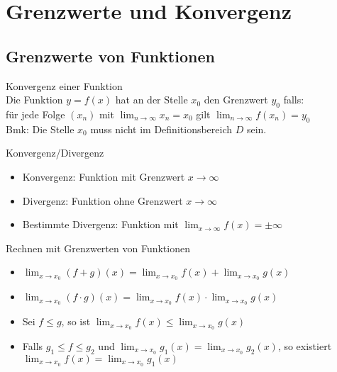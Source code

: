 \section{Grenzwerte und Konvergenz}

\subsection{Grenzwerte von Funktionen}

\begin{definition}{Konvergenz einer Funktion}\\
    Die Funktion $y = f(x)$ hat an der Stelle $x_0$ den Grenzwert $y_0$ falls:\\
    für jede Folge $\left(x_{n}\right)$ mit $\lim _{n \rightarrow \infty} x_{n}=x_{0}$ gilt $\lim _{n \rightarrow \infty} f\left(x_{n}\right)=y_{0}$\\
    Bmk: Die Stelle $x_{0}$ muss nicht im Definitionsbereich $D$ sein.
\end{definition}

\begin{concept}{Konvergenz/Divergenz}
    \begin{itemize}
        \item Konvergenz:
        Funktion mit Grenzwert $x \rightarrow \infty$
        \item Divergenz:
        Funktion ohne Grenzwert $x \rightarrow \infty$
        \item Bestimmte Divergenz:
        Funktion mit $\lim _{x \rightarrow \infty} f(x)= \pm \infty$
    \end{itemize}
\end{concept}

\begin{theorem}{Rechnen mit Grenzwerten von Funktionen}
    \begin{itemize}
        \item $\lim_{x \to x_0} (f + g)(x) = \lim_{x \to x_0} f(x) + \lim_{x \to x_0} g(x)$
        \item $\lim_{x \to x_0} (f \cdot g)(x) = \lim_{x \to x_0} f(x) \cdot \lim_{x \to x_0} g(x)$
        \item Sei $f \leq g$, so ist $\lim_{x \to x_0} f(x) \leq \lim_{x \to x_0} g(x)$
        \item Falls $g_1 \leq f \leq g_2$ und $\lim_{x \to x_0} g_1(x) = \lim_{x \to x_0} g_2(x)$, so existiert $\lim_{x \to x_0} f(x) = \lim_{x \to x_0} g_1(x)$
    \end{itemize}
\end{theorem}

